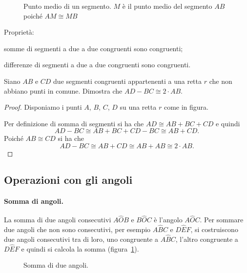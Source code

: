 \begin{figure}[htb]
\centering
\caption{Punto medio di un segmento. $M$ è il punto medio del segmento $AB$ poiché $AM\cong MB$}
\end{figure}

Proprietà:
\begin{itemize*}
\item somme di segmenti a due a due congruenti sono congruenti; 
\item differenze di segmenti a due a due congruenti sono congruenti.
\end{itemize*}

\begin{exrig}
\begin{esempio}
Siano $AB$ e $CD$ due segmenti congruenti appartenenti a una retta $r$ che non abbiano punti in comune. Dimostra che $AD-BC\cong 2\cdot AB$.
\begin{proof}
Disponiamo i punti $A$, $B$, $C$, $D$ su una retta $r$ come in figura.
\begin{figure}[htb]
\centering
\end{figure}

Per definizione di somma di segmenti si ha che $AD\cong AB+BC+CD$ e quindi
\[AD-BC\cong AB+BC+CD-BC\cong AB+CD.\]
Poiché $AB\cong CD$ si ha che
\[AD-BC\cong AB+CD\cong AB+AB\cong 2\cdot AB.\]
\end{proof}
\end{esempio}
\end{exrig}

\subsection{Operazioni con gli angoli}

\paragraph{Somma di angoli.} La somma di due angoli consecutivi $A\widehat{O}B$ e $B\widehat{O}C$ è l'angolo $A\widehat{O}C$. Per sommare due angoli che non sono consecutivi, per esempio $A\widehat{B}C$ e $D\widehat{E}F$, si costruiscono due angoli consecutivi tra di loro, uno congruente a $A\widehat{B}C$, l'altro congruente a $D\widehat{E}F$ e quindi si calcola la somma (figura~\ref{fig:1.32}).

\begin{figure}[htb]
\centering
\caption{Somma di due angoli.}\label{fig:1.32}
\end{figure}

